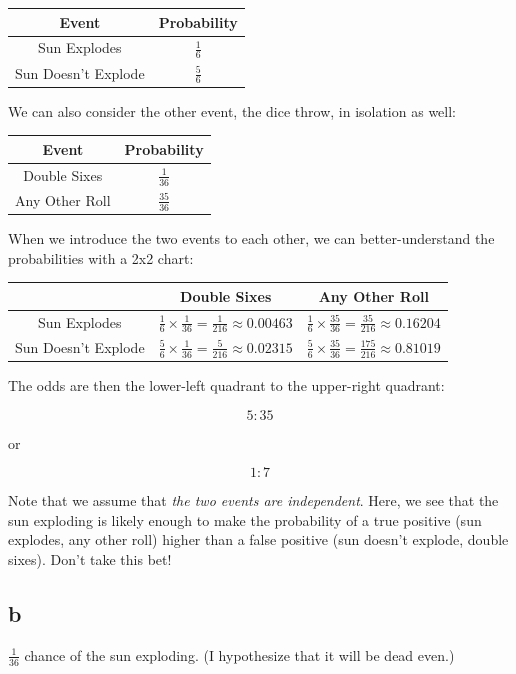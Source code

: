\documentclass{article}
\begin{document}
\begin{tabular}{c | c}
	Event & Probability\\
	\hline
	Sun Explodes & $\frac{1}{6}$ \\
	Sun Doesn't Explode & $\frac{5}{6}$ \\
\end{tabular}

We can also consider the other event, the dice throw, in isolation as well:

\begin{tabular}{c | c}
	Event & Probability\\
	\hline
	Double Sixes & $\frac{1}{36}$ \\
	Any Other Roll & $\frac{35}{36}$ \\
\end{tabular}

When we introduce the two events to each other, we can better-understand the 
probabilities with a 2x2 chart:

\begin{tabular}{c | c c}
	  & Double Sixes & Any Other Roll \\
	\hline
	Sun Explodes & $\frac{1}{6} \times \frac{1}{36} = \frac{1}{216} \approx 0.00463 $ & $\frac{1}{6} \times \frac{35}{36} = \frac{35}{216} \approx 0.16204 $ \\
	Sun Doesn't Explode & $\frac{5}{6} \times \frac{1}{36} = \frac{5}{216} \approx 0.02315 $ & $\frac{5}{6} \times \frac{35}{36} = \frac{175}{216} \approx 0.81019 $ \\
\end{tabular}

The odds are then the lower-left quadrant to the upper-right quadrant:

$$
5:35
$$

or

$$
1:7
$$

Note that we assume that \textit{the two events are independent}. Here, we see 
that the sun exploding is likely enough to make the probability of a true 
positive (sun explodes, any other roll) higher than a false positive (sun 
doesn't explode, double sixes). Don't take this bet!

\subsection{b}

$\frac{1}{36}$ chance of the sun exploding. (I hypothesize that it will be 
dead even.)
\end{document}
